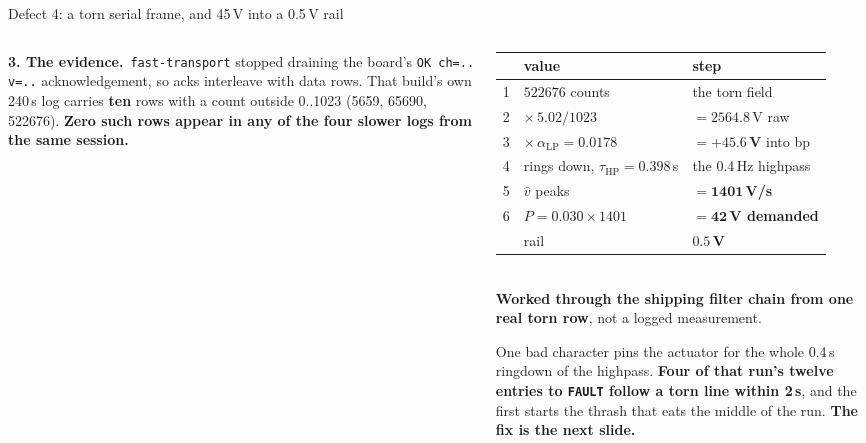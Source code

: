 \documentclass[aspectratio=169]{beamer}
\newcommand{\evidence}{\textbf{3. The evidence.}}
\begin{document}
\begin{frame}{Defect 4: a torn serial frame, and 45\,V into a 0.5\,V rail}
\begin{columns}[T]
\begin{column}{0.49\textwidth}
      \vspace{2mm}
      \raggedright
      \evidence\ \texttt{fast-transport} stopped draining the board's
      \texttt{OK ch=.. v=..} acknowledgement, so acks interleave with data rows.
      That build's own 240\,s log carries \textbf{ten} rows with a count outside
      0..1023 (5659, 65690, 522676). \alert{\textbf{Zero such rows appear in any
      of the four slower logs from the same session.}}
    \end{column}
    \begin{column}{0.49\textwidth}
      \centering
      {\scriptsize
      \begin{tabular}{@{}rll@{}}
        \toprule
        & value & step \\
        \midrule
        1 & $522676$ counts & the torn field \\
        2 & $\times\,5.02/1023$ & $= 2564.8$\,V raw \\
        3 & $\times\,\alpha_{\mathrm{LP}} = 0.0178$ &
            $= \mathbf{+45.6}$\,\textbf{V} into bp \\
        4 & rings down, $\tau_{\mathrm{HP}} = 0.398$\,s & the 0.4\,Hz highpass \\
        5 & $\hat{v}$ peaks & $= \mathbf{1401}$\,\textbf{V/s} \\
        6 & $P = 0.030 \times 1401$ &
            $= \mathbf{42}$\,\textbf{V demanded} \\
        \midrule
        & rail & $\mathbf{0.5}$\,\textbf{V} \\
        \bottomrule
      \end{tabular}}\\[1mm]
      {\scriptsize \textbf{Worked through the shipping filter chain from one real
      torn row}, not a logged measurement.}

      \vspace{1.5mm}
      \raggedright
      One bad character pins the actuator for the whole 0.4\,s ringdown of the
      highpass. \textbf{Four of that run's twelve entries to \texttt{FAULT}
      follow a torn line within 2\,s}, and the first starts the thrash that eats
      the middle of the run. \textbf{The fix is the next slide.}
    \end{column}
  \end{columns}
\end{frame}
\end{document}
